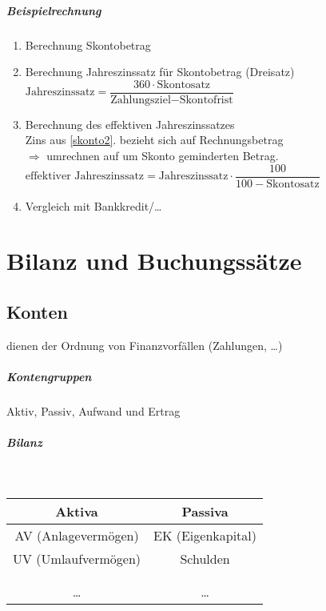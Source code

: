 \paragraph{Beispielrechnung}
\begin{enumerate}
	\item Berechnung Skontobetrag
	\item\label{skonto2} Berechnung Jahreszinssatz für Skontobetrag (Dreisatz)\\
	$\text{Jahreszinssatz} = \dfrac{360\cdot\text{Skontosatz}}{\text{Zahlungsziel} - \text{Skontofrist}}$
	\item Berechnung des effektiven Jahreszinssatzes\\
	Zins aus \ref*{skonto2}. bezieht sich auf Rechnungsbetrag\\
	$\Rightarrow$ umrechnen auf um Skonto geminderten Betrag.\\
	$\text{effektiver Jahreszinssatz} = \text{Jahreszinssatz}\cdot\dfrac{100}{100 - \text{Skontosatz}}$
	\item Vergleich mit Bankkredit/\ldots
\end{enumerate}

\clearpage
\chapter{Bilanz und Buchungssätze}
\section{Konten}
dienen der Ordnung von Finanzvorfällen (Zahlungen, \ldots)

\paragraph{Kontengruppen} Aktiv, Passiv, Aufwand und Ertrag

\paragraph{Bilanz}\quad\\
\begin{tabular}{c|c}
	Aktiva & Passiva\\\hline
	AV (Anlagevermögen) & EK (Eigenkapital)\\
	UV (Umlaufvermögen) & Schulden\\
	&\\
	&\\\hline
	\ldots & \ldots\\
\end{tabular}

